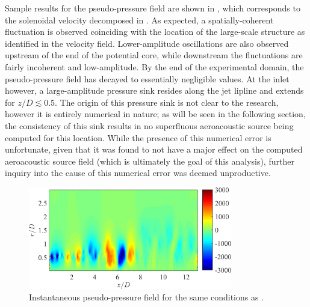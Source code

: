 Sample results for the pseudo-pressure field are shown in , which corresponds to the solenoidal velocity decomposed in .
As expected, a spatially-coherent fluctuation is observed coinciding with the location of the large-scale structure as identified in the velocity field.
Lower-amplitude oscillations are also observed upstream of the end of the potential core, while downstream the fluctuations are fairly incoherent and low-amplitude.
By the end of the experimental domain, the pseudo-pressure field has decayed to essentially negligible values.
At the inlet however, a large-amplitude pressure sink resides along the jet lipline and extends for $z/D \lesssim 0.5$.
The origin of this pressure sink is not clear to the research, however it is entirely numerical in nature; as will be seen in the following section, the consistency of this sink results in no superfluous aeroacoustic source being computed for this location.
While the presence of this numerical error is unfortunate, given that it was found to not have a major effect on the computed aeroacoustic source field (which is ultimately the goal of this analysis), further inquiry into the cause of this numerical error was deemed unproductive.
\begin{figure}
	\centering
	\includegraphics[width = 3.5in]{Figures/ch5_valid_Inst_ps.png}
	\caption{Instantaneous pseudo-pressure field for the same conditions as .}
	\label{fig:valid_pseudopressure}
\end{figure}
